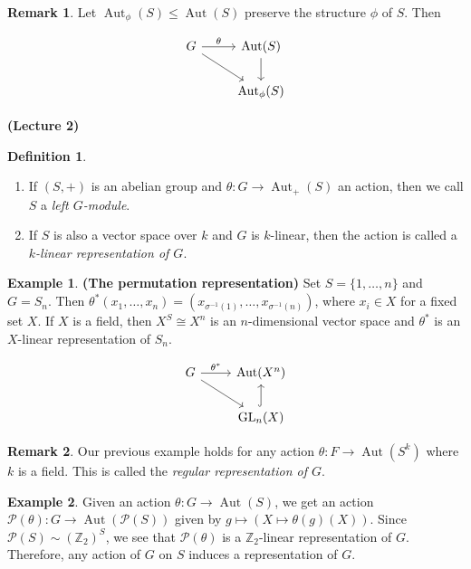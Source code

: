 \documentclass[10pt,letterpaper,cm]{nupset}
\theoremstyle{definition}
\newtheorem*{definition}{Definition}
\newtheorem{exmp}{Example}
\newtheorem{remark}{Remark}
\renewcommand{\P}{\mathcal P}
\newcommand{\Z}{\mathbb Z}
\newcommand{\1}{\mathbf{1}}
\newcommand{\0}{\vec 0}
\DeclareMathOperator*{\GL}{GL}
\DeclareMathOperator{\aut}{Aut}
\begin{document}
\begin{remark} Let $\aut_\phi(S) \leq \aut(S)$ preserve the structure $\phi$ of $S$. Then 

\[ \begin{tikzcd}
G \arrow{r}{\theta} \arrow[swap]{dr} & \aut(S) \arrow{d} \\%
 & \aut_\phi(S)
\end{tikzcd}
\]

\end{remark}

\begin{center}
{\textbf{(Lecture 2)}}
\end{center}


\begin{definition}  $ $
\begin{enumerate}
\item If $(S, +)$ is an abelian group and $\theta : G \to \aut_+(S)$ an action, then we call $S$ a \textit{left $G$-module}.
\item If $S$ is also a vector space over $k$ and $G$ is $k$-linear, then the action is called a \textit{$k$-linear representation of $G$}.
\end{enumerate}
\end{definition}

\begin{exmp}{\textbf{(The permutation representation)}}
Set $S = \{1, \ldots, n\}$ and $G = S_n$. Then $\theta^{\ast}(x_1, \ldots, x_n) = (x_{\sigma^{-1}(1)}, \ldots, x_{\sigma^{-1}(n)})$, where $x_i \in X$ for a fixed set $X$. If $X$ is a field, then $X^S \cong X^n$ is an $n$-dimensional vector space and $\theta^\ast$ is an $X$-linear representation of $S_n$.

\[ \begin{tikzcd}
G \arrow{r}{\theta^{\ast}} \arrow[swap]{dr} & \aut(X^n) \\%
 & \GL_n(X) \arrow[hookrightarrow]{u}
\end{tikzcd}
\]

\end{exmp}

\begin{remark}
Our previous example holds for any action $\theta: F \to \aut(S^k)$ where $k$ is a field. This is called the \textit{regular representation of $G$}.
\end{remark}

\begin{exmp}
Given an action $\theta: G \to \aut(S)$, we get an action $\P(\theta): G \to \aut(\P(S))$ given by $g \mapsto (X \mapsto \theta(g)(X))$. Since $\P(S) \sim (\Z_2)^S$, we see that $\P(\theta)$  is a $\Z_2$-linear representation of $G$. Therefore, any action of $G$ on $S$ induces a representation of $G$.
\end{exmp}
\end{document}
